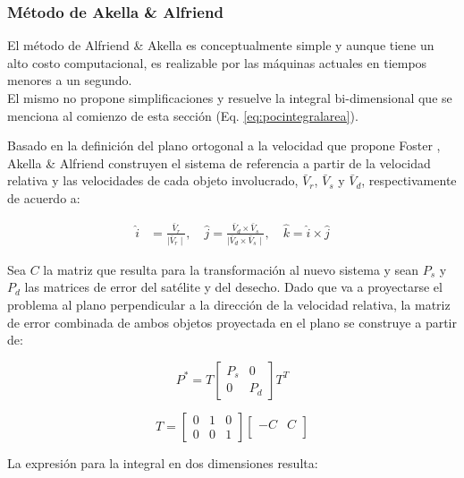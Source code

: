 \subsubsection{M\'etodo de Akella \& Alfriend}
El m\'etodo de Alfriend \& Akella \citep{akellaAlfriend} es conceptualmente simple y aunque tiene un alto costo computacional, es realizable por las m\'aquinas actuales en tiempos menores a un segundo.\\

El mismo no propone simplificaciones y resuelve la integral bi-dimensional que se menciona al comienzo de esta secci\'on (Eq. \ref{eq:pocintegralarea}). 

Basado en la definici\'on del plano ortogonal a la velocidad que propone  Foster \citep{foster}, Akella \& Alfriend construyen el sistema de referencia a partir de la velocidad relativa y las velocidades de cada objeto involucrado, $\bar{V}_{r}$, $\bar{V}_{s}$ y $\bar{V}_{d}$,  respectivamente de acuerdo a: 

\begin{align}
 \hat{i}&=\frac{\bar{V}_{r}}{\mid \bar{V}_{r}\mid}, \quad \hat{j}=\frac{\bar{V}_{d} \times \bar{V}_{s} }{\mid \bar{V}_{d} \times \bar{V}_{s}\mid}, \quad \hat{k}=\hat{i}\times\hat{j}
\end{align}

Sea $C$ la matriz que resulta para la transformaci\'on al nuevo sistema y sean $P_{s}$ y $P_{d}$ las matrices de error del sat\'elite y del desecho. Dado que va a proyectarse el problema al plano perpendicular a la direcci\'on de la velocidad relativa, la matriz de error combinada de ambos objetos proyectada en el plano se construye a partir de:

\begin{equation}
 P^{*}=T \begin{bmatrix}
P_{s} & 0 \\ 
0 & P_{d}
\end{bmatrix} T^{T}
\end{equation}


\begin{equation}
 T= \begin{bmatrix}
0 & 1 & 0\\ 
0 & 0 & 1
\end{bmatrix} 
 \begin{bmatrix}
-C & C \\
\end{bmatrix} 
\end{equation}

La expresi\'on para la integral en dos dimensiones resulta:

